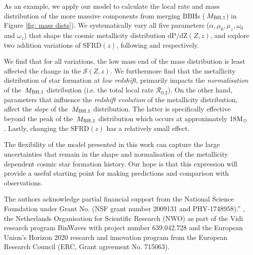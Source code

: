 \documentclass[twocolumn]{aastex631}
\newcommand{\Msun}{\ensuremath{\rm{M}_{\odot}}\xspace}
\newcommand{\Mbheen}{\ensuremath{\,M_{\rm BH, 1}}\xspace}
\newcommand{\SFRDzZ}{\ensuremath{\mathcal{S}(Z,z)}\xspace}
\newcommand{\SFRDz}{\ensuremath{\mathrm{SFRD}(z)}\xspace}
\newcommand{\dpdZ}{\ensuremath{\mathrm{dP/dZ}(Z,z)}\xspace}
\begin{document}
As an example, we apply our model to calculate the local rate and mass distribution of the more massive components from merging BBHs (\Mbheen) in Figure \ref{fig: mass dists}). 
We systematically vary all five parameters ($\alpha, \mu_0, \mu_z, \omega_0$ and $\omega_z$) that shape the cosmic metallicity distribution \dpdZ, and explore two addition variations of \SFRDz, following \cite{Madau+2017} and \cite{Neijssel+2019} respectively. 


We find that for all variations, the low mass end of the mass distribution is least affected the change in the \SFRDzZ. 
%
We furthermore find that the metallicity distribution of star formation at \textit{low redshift}, primarily impacts the \textit{normalisation} of the \Mbheen distribution (i.e. the total local rate $\mathcal{R}_{0.2}$).
On the other hand, parameters that influence the \textit{redshift evolution} of the metallicity distribution, affect the \textit{slope} of the \Mbheen distribution. The latter is specifically effective beyond the peak of the \Mbheen distribution which occurs at approximately 18\Msun. 
%
Lastly, changing the \SFRDz has a relatively small effect.

The flexibility of the model presented in this work can capture the large uncertainties that remain in the shape and normalisation of the metallicity dependent cosmic star formation history. 
Our hope is that this expression will provide a useful starting point for making predictions and comparison with observations.




\begin{acknowledgments}
The authors acknowledge partial financial support from the  National Science Foundation under Grant No. (NSF grant number 2009131  and PHY-1748958).”
, the Netherlands Organisation for Scientific Research (NWO) as part of the Vidi research program BinWaves with project number 639.042.728 and the European Union’s Horizon 2020 research and innovation program from the European Research Council (ERC, Grant agreement No. 715063). 
\end{acknowledgments}



\end{document}

